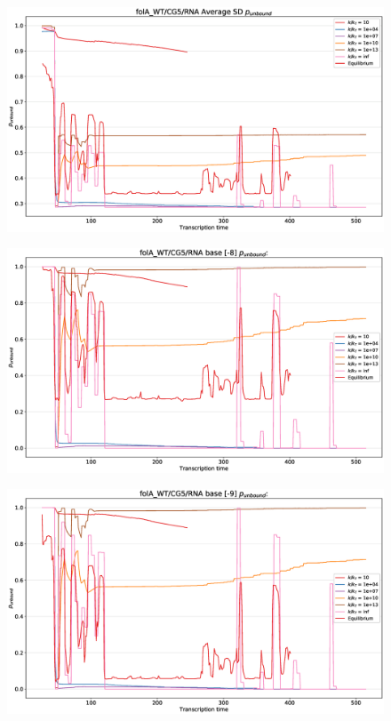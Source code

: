 \documentclass[11pt, a4paper]{article}
\begin{document}
\begin{figure}
	\centering
	\includegraphics[width=\linewidth]{p_unbound/RNA_p_unbound_SD_k_tuning}
	\caption{}
	\label{fig:RNA_p_unbound_SD_k_tuning}
\end{figure}
\begin{figure}
\centering
\includegraphics[width=\linewidth]{p_unbound/RNA_p_unbound_base[-8]_k_tuning}
\caption{}
\label{fig:RNA_p_unbound_base[-8]_k_tuning}
\end{figure}
\begin{figure}
\centering
\includegraphics[width=\linewidth]{p_unbound/RNA_p_unbound_base[-9]_k_tuning}
\caption{}
\label{fig:RNA_p_unbound_base[-9]_k_tuning}
\end{figure}
\end{document}
